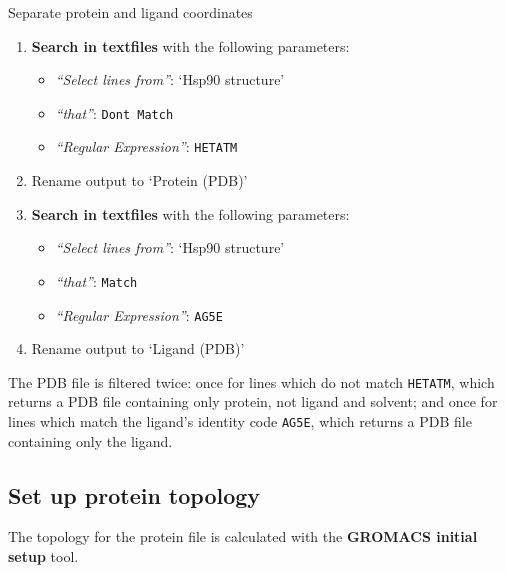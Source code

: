 \documentclass[twocolumn]{bmcart}%
\providecommand{\tightlist}{%
  \setlength{\itemsep}{0pt}\setlength{\parskip}{0pt}}
\begin{document}
\begin{handson_box_colour}{Separate protein and ligand coordinates}

\begin{enumerate}
\def\labelenumi{\arabic{enumi}.}
\tightlist
\item
  \textbf{Search in textfiles} with the following parameters:
  \begin{itemize}
  \tightlist
  \item
    \emph{``Select lines from''}: `Hsp90 structure'
  \item
    \emph{``that''}: \texttt{Don\textquotesingle{}t\ Match}
  \item
    \emph{``Regular Expression''}: \texttt{HETATM}
  \end{itemize}
\item
  Rename output to `Protein (PDB)'
\item
  \textbf{Search in textfiles} with the following parameters:

  \begin{itemize}
  \tightlist
  \item
    \emph{``Select lines from''}: `Hsp90 structure'
  \item
    \emph{``that''}: \texttt{Match}
  \item
    \emph{``Regular Expression''}: \texttt{AG5E}
  \end{itemize}
\item
  Rename output to `Ligand (PDB)'
\end{enumerate}

\end{handson_box_colour}

The PDB file is filtered twice: once for lines which do not match \texttt{HETATM}, which returns a PDB file containing only protein, not ligand and solvent; and once for lines which match the ligand's identity code \texttt{AG5E}, which returns a PDB file containing only the ligand.

\hypertarget{set-up-protein-topology}{%
\subsection*{Set up protein topology}\label{set-up-protein-topology}}

The topology for the protein file is calculated with the \textbf{GROMACS initial setup} tool.
\end{document}
